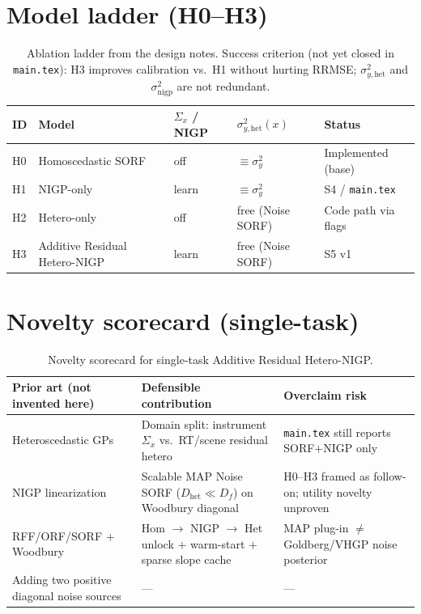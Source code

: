 \documentclass[11pt]{article}
\newcommand{\sigy}{\sigma_{y}^{2}}
\newcommand{\sighet}{\sigma_{y,\mathrm{het}}^{2}}
\newcommand{\signigp}{\sigma_{\mathrm{nigp}}^{2}}
\newcommand{\Sigx}{\Sigma_{x}}
\begin{document}
\FloatBarrier
\section{Model ladder (H0--H3)}
\label{sec:ladder}

\begin{table}[H]
\centering
\small
\begin{tabular}{@{}lllll@{}}
\toprule
\textbf{ID} & \textbf{Model} & $\Sigx$ / NIGP & $\sighet(x)$ & \textbf{Status} \\
\midrule
H0 & Homoscedastic SORF & off & $\equiv\sigy$ & Implemented (base) \\
H1 & NIGP-only & learn & $\equiv\sigy$ & S4 / \texttt{main.tex} \\
H2 & Hetero-only & off & free (Noise SORF) & Code path via flags \\
H3 & Additive Residual Hetero-NIGP & learn & free (Noise SORF) & S5 v1 \\
\bottomrule
\end{tabular}
\caption{Ablation ladder from the design notes.
Success criterion (not yet closed in \texttt{main.tex}): H3 improves
calibration vs.\ H1 without hurting RRMSE; $\sighet$ and $\signigp$ are not
redundant.}
\label{tab:ladder}
\end{table}

\FloatBarrier
\section{Novelty scorecard (single-task)}
\label{sec:novelty}

\begin{table}[H]
\centering
\small
\begin{tabular}{@{}>{\raggedright\arraybackslash}p{3.6cm}
  >{\raggedright\arraybackslash}p{4.0cm}
  >{\raggedright\arraybackslash}p{4.0cm}@{}}
\toprule
\textbf{Prior art (not invented here)} &
\textbf{Defensible contribution} &
\textbf{Overclaim risk} \\
\midrule
Heteroscedastic GPs
\cite{goldberg1998heteroscedastic,kersting2007mlhgp,lazaro2011vhgp}
& Domain split: instrument $\Sigx$ vs.\ RT/scene residual hetero
& \texttt{main.tex} still reports SORF$+$NIGP only \\[0.4em]
NIGP linearization \cite{mchutchon2011nigp}
& Scalable MAP Noise SORF ($D_{\mathrm{het}}\ll D_f$) on Woodbury diagonal
& H0--H3 framed as follow-on; utility novelty unproven \\[0.4em]
RFF/ORF/SORF $+$ Woodbury
\cite{rahimi2007rff,yu2016orf,cutajar2017dgp}
& Hom $\to$ NIGP $\to$ Het unlock $+$ warm-start $+$ sparse slope cache
& MAP plug-in $\neq$ Goldberg/VHGP noise posterior \\[0.4em]
Adding two positive diagonal noise sources
& --- & --- \\
\bottomrule
\end{tabular}
\caption{Novelty scorecard for single-task Additive Residual Hetero-NIGP.}
\label{tab:novelty}
\end{table}
\end{document}
